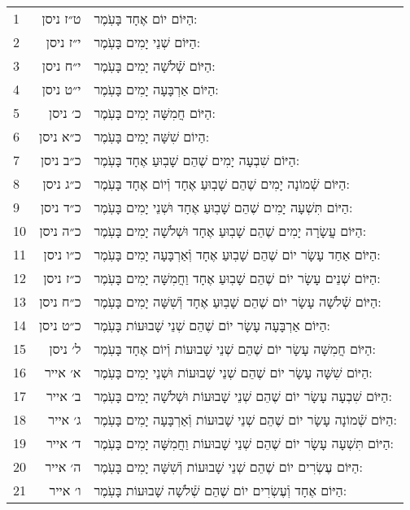 \documentclass[twoside, openany, parskip=half, 11pt]{book}
\begin{document}
\begin{scriptsize}
	\begin{longtable}{ l | r | p{} }
		1 & ט״ז ניסן & הַיּוֹם יוֹם אֶחָד בָּעֹֽמֶר: \\
		2 & י״ז ניסן & הַיּוֹם שְׁנֵי יָמִים בָּעֹֽמֶר: \\
		3 & י״ח ניסן & הַיּוֹם שְֿׁלֹשָׁה יָמִים בָּעֹֽמֶר: \\
		4 & י״ט ניסן & הַיּוֹם אַרְבָּעָה יָמִים בָּעֹֽמֶר: \\
		5 & כ׳ ניסן & הַיּוֹם חֲמִשָּׁה יָמִים בָּעֹֽמֶר: \\
		6 & כ״א ניסן & הַיוֹם שִׁשָּׁה יָמִים בָּעֹֽמֶר: \\
		7 & כ״ב ניסן & הַיּוֹם שִׁבְעָה יָמִים שֶׁהֵם שָׁבֽוּעַ אֶחָד בָּעֹֽמֶר: \\
		8 & כ״ג ניסן & הַיּוֹם שְֿׁמוֹנָה יָמִים שֶׁהֵם שָׁבֽוּעַ אֶחָד וְֿיוֹם אֶחָד בָּעֹֽמֶר: \\
		9 & כ״ד ניסן & הַיּוֹם תִּשְׁעָה יָמִים שֶׁהֵם שָׁבֽוּעַ אֶחָד וּשְׁנֵי יָמִים בָּעֹֽמֶר: \\
		10 & כ״ה ניסן & הַיּוֹם עֲשָׂרָה יָמִים שֶׁהֵם שָׁבֽוּעַ אֶחָד וּשְׁלֹשָׁה יָמִים בָּעֹֽמֶר: \\
		11 & כ״ו ניסן & הַיּוֹם אַחַד עָשָׂר יוֹם שֶׁהֵם שָׁבֽוּעַ אֶחָד וְֿאַרְבָּעָה יָמִים בָּעֹֽמֶר: \\
		12 & כ״ז ניסן & הַיּוֹם שְׁנֵים עָשָׂר יוֹם שֶׁהֵם שָׁבֽוּעַ אֶחָד וַחֲמִשָּׁה יָמִים בָּעֹֽמֶר: \\
		13 & כ״ח ניסן & הַיּוֹם שְֿׁלֹשָׁה עָשָׂר יוֹם שֶׁהֵם שָׁבֽוּעַ אֶחָד וְֿשִׁשָּׁה יָמִים בָּעֹֽמֶר: \\
		14 & כ״ט ניסן & הַיּוֹם אַרְבָּעָה עָשָׂר יוֹם שֶׁהֵם שְׁנֵי שָׁבוּעוֹת בָּעֹֽמֶר: \\
		15 & ל׳ ניסן & הַיּוֹם חֲמִשָּׁה עָשָׂר יוֹם שֶׁהֵם שְׁנֵי שָׁבוּעוֹת וְֿיוֹם אֶחָד בָּעֹֽמֶר: \\
		16 & א׳ אייר & הַיּוֹם שִׁשָּׁה עָשָׂר יוֹם שֶׁהֵם שְׁנֵי שָׁבוּעוֹת וּשְׁנֵי יָמִים בָּעֹֽמֶר: \\
		17 & ב׳ אייר & הַיּוֹם שִׁבְעָה עָשָׂר יוֹם שֶׁהֵם שְׁנֵי שָׁבוּעוֹת וּשְׁלֹשָׁה יָמִים בָּעֹֽמֶר: \\
		18 & ג׳ אייר & הַיּוֹם שְֿׁמוֹנָה עָשָׂר יוֹם שֶׁהֵם שְׁנֵי שָׁבוּעוֹת וְֿאַרְבָּעָה יָמִים בָּעֹֽמֶר: \\
		19 & ד׳ אייר & הַיּוֹם תִּשְׁעָה עָשָׂר יוֹם שֶׁהֵם שְׁנֵי שָׁבוּעוֹת וַחֲמִשָּׁה יָמִים בָּעֹֽמֶר: \\
		20 & ה׳ אייר & הַיּוֹם עֶשְׂרִים יוֹם שֶׁהֵם שְׁנֵי שָׁבוּעוֹת וְֿשִׁשָּׁה יָמִים בָּעֹֽמֶר: \\
		21 & ו׳ אייר & הַיּוֹם אֶחָד וְֿעֶשְׂרִים יוֹם שֶׁהֵם שְֿׁלֹשָׁה שָׁבוּעוֹת בָּעֹֽמֶר: \\

\end{longtable}
\end{scriptsize}
\end{document}
